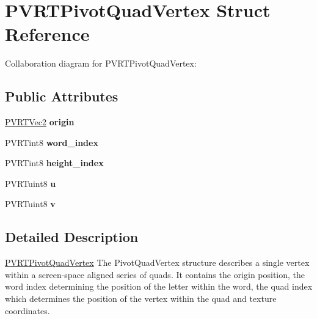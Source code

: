 \hypertarget{struct_p_v_r_t_pivot_quad_vertex}{\section{P\+V\+R\+T\+Pivot\+Quad\+Vertex Struct Reference}
\label{struct_p_v_r_t_pivot_quad_vertex}
}


Collaboration diagram for P\+V\+R\+T\+Pivot\+Quad\+Vertex\+:
\subsection*{Public Attributes}
\begin{DoxyCompactItemize}
\item 
\hypertarget{struct_p_v_r_t_pivot_quad_vertex_a9c1ba2a83638c960c50a252b353501ac}{\hyperlink{struct_p_v_r_t_vec2}{P\+V\+R\+T\+Vec2} {\bfseries origin}}\label{struct_p_v_r_t_pivot_quad_vertex_a9c1ba2a83638c960c50a252b353501ac}

\item 
\hypertarget{struct_p_v_r_t_pivot_quad_vertex_a655f219db0acf9b32cdcbfd5dfe543ae}{P\+V\+R\+Tint8 {\bfseries word\+\_\+index}}\label{struct_p_v_r_t_pivot_quad_vertex_a655f219db0acf9b32cdcbfd5dfe543ae}

\item 
\hypertarget{struct_p_v_r_t_pivot_quad_vertex_aa44eddadb769b6b79a9078cbe1baa935}{P\+V\+R\+Tint8 {\bfseries height\+\_\+index}}\label{struct_p_v_r_t_pivot_quad_vertex_aa44eddadb769b6b79a9078cbe1baa935}

\item 
\hypertarget{struct_p_v_r_t_pivot_quad_vertex_a2ae9d499f679f7fb1b84031dfc7f360c}{P\+V\+R\+Tuint8 {\bfseries u}}\label{struct_p_v_r_t_pivot_quad_vertex_a2ae9d499f679f7fb1b84031dfc7f360c}

\item 
\hypertarget{struct_p_v_r_t_pivot_quad_vertex_ac6e14ed3e96b4491ec5d4d06ac0895ba}{P\+V\+R\+Tuint8 {\bfseries v}}\label{struct_p_v_r_t_pivot_quad_vertex_ac6e14ed3e96b4491ec5d4d06ac0895ba}

\end{DoxyCompactItemize}


\subsection{Detailed Description}


  \hyperlink{struct_p_v_r_t_pivot_quad_vertex}{P\+V\+R\+T\+Pivot\+Quad\+Vertex}  The Pivot\+Quad\+Vertex structure describes a single vertex within a screen-\/space aligned series of quads. It contains the origin position, the word index determining the position of the letter within the word, the quad index which determines the position of the vertex within the quad and texture coordinates. 

